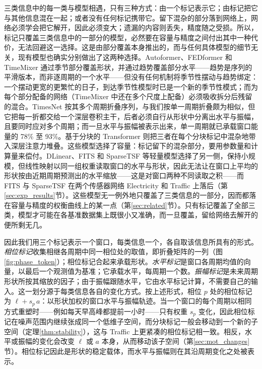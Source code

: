 {
三类信息中的每一类与模型相遇，只有三种方式：由一个标记表示它；由标记把它与其他信息混在一起；或者没有任何标记携带它。留下混杂的部分落到网络上，网络必须学会把它解开，因此必须变大；遗漏的内容则丢失，精度随之受损。所以，标记只覆盖三类信息中的一部分的模型，必然要在容量与精度之间付出其中一种代价，无法回避这一选择。这是由部分覆盖本身推出的，而与任何具体模型的细节无关，现有模型也确实分别做出了这两种选择。Autoformer、FEDformer 和 TimeMixer 通过季节部分覆盖形状，并通过趋势覆盖部分水平——趋势是序列的平滑版本，而非逐周期的一个水平——但没有任何机制将季节性摆动与趋势绑定：一个摆动更宽的更繁忙的日子，到达季节性模型时已是一个新的季节性模式；而为每个部分配备的网络（TimeMixer 中还在多个尺度上配备）必须吸收拆分后残留的混合。TimesNet 按其多个周期折叠序列，与我们按单一周期折叠颇为相似，但它把每一折都交给一个深层卷积主干，后者必须自行从形状中分离出水平与振幅，且要同时应对多个周期；而一旦水平与振幅被表示出来，单一周期就已承载窗口能量的 78\% 至 93\%。基于分块的 Transformer 则把三者在每个分块标记中混杂地带入深层注意力堆叠。这些模型选择了容量：标记留下的混杂部分，要用参数量和计算量来偿付。DLinear、FITS 和 SparseTSF 等轻量模型选择了另一侧，保持小规模，但线性映射以同一组权重读取窗口的水平与形状，因此无法让在窗口上平均的形状按由近期周期预测出的水平缩放——这是对窗口两种不同读取之积——而 FITS 与 SparseTSF 在两个传感器网络 Electricity 和 Traffic 上落后（第\ref{sec:exp_results}节）。这些模型无一例外地只覆盖了三类信息的一部分，因而都落在容量与精度的权衡曲线上的某一点（第\ref{sec:related}节）。只有标记覆盖了全部三类，模型才可能在各基准数据集上既很小又准确，而一旦覆盖，留给网络去解开的便所剩无几。

因此我们用三个标记表示一个窗口，每类信息一个，各自取该信息所具有的形式。\emph{相位标记}收集相继各周期中同一相位处的取值，即折叠矩阵的一列（图\ref{fig:phase_token}）；相位标记合起来承载形状。\emph{水平标记}是窗口各周期均值的向量，以最后一个观测值为基准；它承载水平，每周期一个数。\emph{振幅标记}是未来周期形状所按其缩放的因子；由于振幅跟随水平，它由水平标记计算，不需要自己的输入。这一划分源于每类信息各自的变化方式。按上述形式，相位 $p$ 处的相位标记为 $\ell+s_p\,a$：以形状加权的窗口水平与振幅轨迹。当一个窗口的每个周期以相同方式重塑时——例如每天早高峰都提前一小时——只有权重 $s_p$ 变化，因此相位标记在噪声范围内继续张成同一个低维子空间，而分块标记一般会移动到一个新的子空间（定理\ref{thm:stability}），这与 Traffic 上更紧凑的相位标记相一致。相反，水平或振幅的变化会改变 $\ell$ 或 $a$ 本身，从而移动该子空间（第\ref{sec:mot_changes}节）。相位标记因此是形状的稳定载体，而水平与振幅则在其沿周期变化之处被表示。

}
